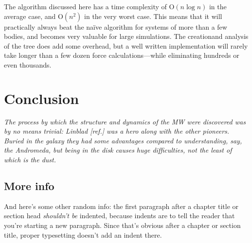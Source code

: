 \documentclass[12pt,twoside]{reedthesis}
\begin{document}
The algorithm discussed here has a time complexity of O$(n \log n)$ in the average case, and O$(n^2)$ in the very worst case. This means that it will practically always beat the na\"ive algorithm for systems of more than a few bodies, and becomes very valuable for large simulations. The creationand analysis of the tree does add some overhead, but a well written implementation will rarely take longer than a few dozen force calculations---while eliminating hundreds or even thousands.



\chapter*{Conclusion}
	\setcounter{chapter}{4}
	\setcounter{section}{0}

\emph{The process by which the structure and dynamics of the MW were discovered was by no means trivial: Linblad [ref.] was a hero along with the other pioneers.  Buried in the galaxy they had some advantages compared to understanding, say, the Andromeda, but being in the disk causes huge difficulties, not the least of which is the dust.}

\section{More info}
And here's some other random info: the first paragraph after a chapter title or section head \emph{shouldn't be} indented, because indents are to tell the reader that you're starting a new paragraph. Since that's obvious after a chapter or section title, proper typesetting doesn't add an indent there.
\end{document}
